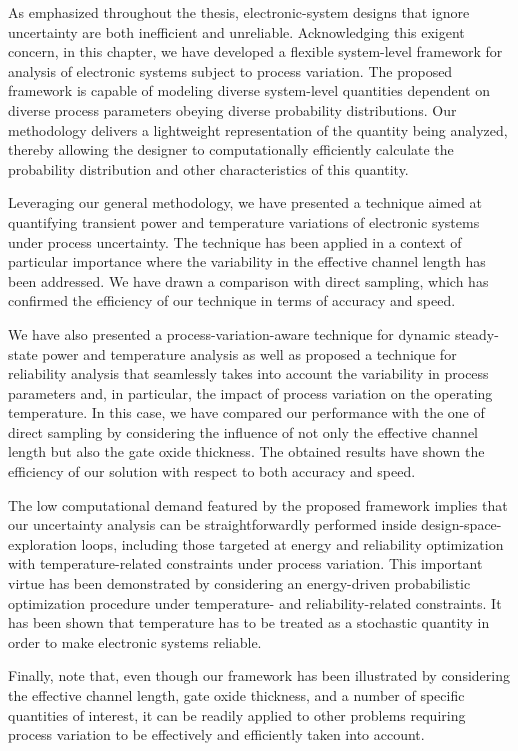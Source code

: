 As emphasized throughout the thesis, electronic-system designs that ignore
uncertainty are both inefficient and unreliable. Acknowledging this exigent
concern, in this chapter, we have developed a flexible system-level framework
for analysis of electronic systems subject to process variation. The proposed
framework is capable of modeling diverse system-level quantities dependent on
diverse process parameters obeying diverse probability distributions. Our
methodology delivers a lightweight representation of the quantity being
analyzed, thereby allowing the designer to computationally efficiently calculate
the probability distribution and other characteristics of this quantity.

Leveraging our general methodology, we have presented a technique aimed at
quantifying transient power and temperature variations of electronic systems
under process uncertainty. The technique has been applied in a context of
particular importance where the variability in the effective channel length has
been addressed. We have drawn a comparison with direct sampling, which has
confirmed the efficiency of our technique in terms of accuracy and speed.

We have also presented a process-variation-aware technique for dynamic
steady-state power and temperature analysis as well as proposed a technique for
reliability analysis that seamlessly takes into account the variability in
process parameters and, in particular, the impact of process variation on the
operating temperature. In this case, we have compared our performance with the
one of direct sampling by considering the influence of not only the effective
channel length but also the gate oxide thickness. The obtained results have
shown the efficiency of our solution with respect to both accuracy and speed.

The low computational demand featured by the proposed framework implies that our
uncertainty analysis can be straightforwardly performed inside
design-space-exploration loops, including those targeted at energy and
reliability optimization with temperature-related constraints under process
variation. This important virtue has been demonstrated by considering an
energy-driven probabilistic optimization procedure under temperature- and
reliability-related constraints. It has been shown that temperature has to be
treated as a stochastic quantity in order to make electronic systems reliable.

Finally, note that, even though our framework has been illustrated by
considering the effective channel length, gate oxide thickness, and a number of
specific quantities of interest, it can be readily applied to other problems
requiring process variation to be effectively and efficiently taken into
account.
